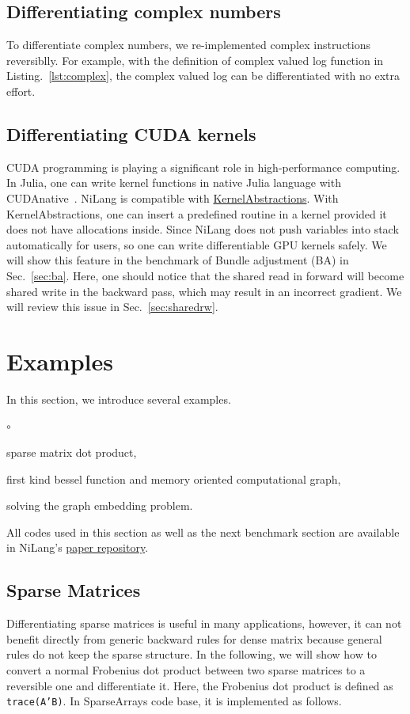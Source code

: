 \documentclass{article}
\newcommand{\<}{\langle}
\renewcommand{\>}{\rangle}
\newcommand{\Lst}[1]{Listing.~\ref{#1}}
\newcommand{\Sec}[1]{Sec.~\ref{#1}}
\theoremstyle{definition}\newtheorem{definition}{\textit{Definition}}
\begin{document}
\subsection{Differentiating complex numbers}
To differentiate complex numbers, we re-implemented complex instructions reversiblly. For example, with the definition of complex valued log function in \Lst{lst:complex}, the complex valued log can be differentiated with no extra effort.

\subsection{Differentiating CUDA kernels}\label{app:cuda}
CUDA programming is playing a significant role in high-performance computing. In Julia, one can write kernel functions in native Julia language with CUDAnative~\cite{Besard2018}.
NiLang is compatible with \href{https://github.com/JuliaGPU/KernelAbstractions.jl}{KernelAbstractions}. With KernelAbstractions, one can insert a predefined routine in a kernel provided it does not have allocations inside.
Since NiLang does not push variables into stack automatically for users, so one can write differentiable GPU kernels safely.
We will show this feature in the benchmark of Bundle adjustment (BA) in \Sec{sec:ba}.
Here, one should notice that the shared read in forward will become shared write in the backward pass, which may result in an incorrect gradient. We will review this issue in \Sec{sec:sharedrw}.

\section{Examples}\label{sec:example}

In this section, we introduce several examples.
\begin{list}{$\circ$}{}
\item sparse matrix dot product,
\item first kind bessel function and memory oriented computational graph,
\item solving the graph embedding problem.
\end{list}

All codes used in this section as well as the next benchmark section are available in NiLang's \href{https://github.com/GiggleLiu/nilangpaper}{paper repository}.

\subsection{Sparse Matrices}
Differentiating sparse matrices is useful in many applications, however, it can not benefit directly from generic backward rules for dense matrix because general rules do not keep the sparse structure.
In the following, we will show how to convert a normal Frobenius dot product between two sparse matrices to a reversible one and differentiate it.
Here, the Frobenius dot product is defined as \texttt{trace(A'B)}.
In SparseArrays code base, it is implemented as follows.
\end{document}
